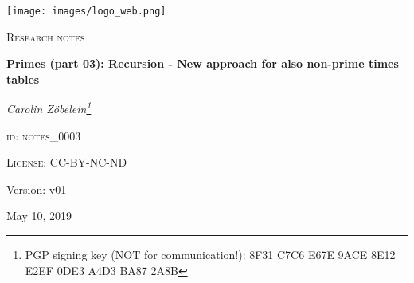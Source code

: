 

\begin{titlepage}
	\begin{center}
    \begin{center}
            \texttt{[image: images/logo\_web.png]}
    \end{center}
    \vspace{1cm}
	{\scshape\Large Research notes\par}
	\vspace{1.5cm}
	{\huge\bfseries Primes (part 03): Recursion - New approach for also non-prime times tables\par}
	\vspace{2cm}
	{\Large\itshape Carolin Z\"obelein\footnote{PGP signing key (NOT for communication!): 8F31 C7C6 E67E 9ACE 8E12 E2EF 0DE3 A4D3 BA87 2A8B}\par}
	\vfill
	\textsc{id: notes\_0003}\par
	\textsc{License: CC-BY-NC-ND}
	\vfill


	\vfill

	{\large Version: v01\par}
	{\large May 10, 2019\par}
	\end{center}
\end{titlepage}

